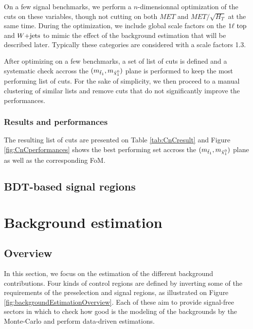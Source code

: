             On a few signal benchmarks, we perform a $n$-dimensionnal optimization of the cuts on these variables,
            though not cutting on both $MET$ and $MET/\sqrt{H_T}$ at the same time. During the optimization,
            we include global scale factors on the $1\ell~\text{top}$ and $\text{$W$+jets}$ to mimic the effect of the background
            estimation that will be described later. Typically these categories are considered with a scale factors
            1.3.

            After optimizing on a few benchmarks, a set of list of cuts is defined and a systematic check accross the
            $(m_{\tilde{t}_1},m_{\tilde{\chi}_1^0})$ plane is performed to keep the most performing list of cuts. For the
            sake of simplicity, we then proceed to a manual clustering of similar lists and remove cuts that do not 
            significantly improve the performances.

            \subsubsection{Results and performances}

            The resulting list of cuts are presented on Table \ref{tab:CnCresult} and Figure \ref{fig:CnCperformances}
            shows the best performing set accross the $(m_{\tilde{t}_1},m_{\tilde{\chi}_1^0})$ plane as well as the
            corresponding FoM.

            \loremipsum

        \subsection{BDT-based signal regions}
        
            \loremipsum

    \section{Background estimation \label{sec:analysis_backgroundEstimation}}

        \subsection{Overview} 

        In this section, we focus on the estimation of the different background contributions. 
        Four kinds of control regions are defined by inverting some of the requirements of the
        preselection and signal regions, as illustrated on Figure \ref{fig:backgroundEstimationOverview}.
        Each of these aim to provide signal-free sectors in which to check how good is the modeling
        of the backgrounds by the Monte-Carlo and perform data-driven estimations.

